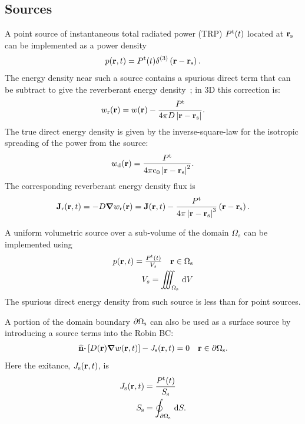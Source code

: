 \documentclass[a4paper]{article}
\numberwithin{equation}{section}
\providecommand\oiint{\oint}
\begin{document}
\subsection[Sources]{Sources}
\label{sc:sum:src}

A point source of instantaneous total radiated power (TRP) $P^{\mathrm{t}}(t)$
located at $\boldsymbol{\mathrm{r}}_{\mathrm{s}}$ can be implemented as a power density
\begin{align}
p(\boldsymbol{\mathrm{r}},t) = P^{\mathrm{t}}(t) \delta^{(3)}\left(\boldsymbol{\mathrm{r}}-\boldsymbol{\mathrm{r}}_{\mathrm{s}}\right).
\end{align}
The energy density near such a source contains a spurious direct term that can
be subtract to give the reverberant energy density~\citep{Visentin2012}; in 3D this correction is:
\begin{align}
w_{\mathrm{r}}(\boldsymbol{\mathrm{r}}) = w(\boldsymbol{\mathrm{r}}) - \frac{P^{\mathrm{t}}}{4\pi D\left|\boldsymbol{\mathrm{r}}-\boldsymbol{\mathrm{r}}_{\mathrm{s}}\right|}.
\end{align}
The true direct energy density is given by the inverse-square-law for the
isotropic spreading of the power from the source:
\begin{align}
w_{\mathrm{d}}(\boldsymbol{\mathrm{r}}) = \frac{P^{\mathrm{t}}}{4\pi\mathrm{c}_0\left|\boldsymbol{\mathrm{r}}-\boldsymbol{\mathrm{r}}_{\mathrm{s}}\right|^2}.
\end{align}
The corresponding reverberant energy density flux is
\begin{align}
\boldsymbol{\mathrm{J}}_{\mathrm{r}}(\boldsymbol{\mathrm{r}},t) = -D\boldsymbol{\mathrm{\nabla}} w_{\mathrm{r}}(\boldsymbol{\mathrm{r}}) = \boldsymbol{\mathrm{J}}(\boldsymbol{\mathrm{r}},t) - \frac{P^{\mathrm{t}}}{4\pi\left|\boldsymbol{\mathrm{r}}-\boldsymbol{\mathrm{r}}_{\mathrm{s}}\right|^3}\left(\boldsymbol{\mathrm{r}}-\boldsymbol{\mathrm{r}}_{\mathrm{s}}\right).
\end{align}

A uniform volumetric source over a sub-volume of the domain $\Omega_s$ can be implemented
using
\begin{align}
\begin{matrix} 
p(\boldsymbol{\mathrm{r}},t) = \frac{P^{\mathrm{t}}(t)}{V_s} &\boldsymbol{\mathrm{r}}\in\Omega_{\mathrm{s}} 
\end{matrix} \\
V_s = \iiint_{\Omega_{\mathrm{s}}}\,\mathrm{d}{V}
\end{align}
The spurious direct energy density from such source is less than for point
sources.

A portion of the domain boundary $\partial\Omega_{\mathrm{s}}$ can also be used as a
surface source by introducing a source terms into the Robin BC:
\begin{align}
\begin{matrix}
\widehat{\boldsymbol{\mathrm{n}}}\boldsymbol{\mathrm{\cdot}}\left[D(\boldsymbol{\mathrm{r}})\boldsymbol{\mathrm{\nabla}} w(\boldsymbol{\mathrm{r}},t)\right] - J_{\mathrm{s}}(\boldsymbol{\mathrm{r}},t) = 0 &\boldsymbol{\mathrm{r}}\in\partial\Omega_{\mathrm{s}}.
\end{matrix}
\end{align}
Here the exitance, $J_{\mathrm{s}}(\boldsymbol{\mathrm{r}},t)$, is
\begin{align}
J_\rs\prt &= \frac{P^\rt(t)}{S_\rs} \\
S_\rs &= \oiint_{\partial\Omega_\rs}\dif{S} .
\end{align}
\end{document}
